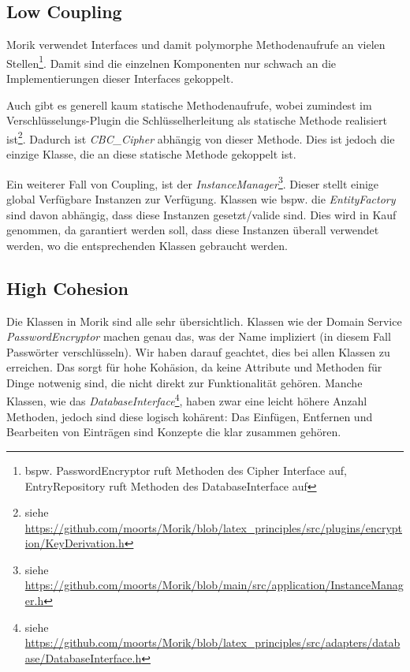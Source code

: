 \subsection{Low Coupling}

Morik verwendet Interfaces und damit polymorphe Methodenaufrufe an vielen Stellen\footnote{bspw. PasswordEncryptor ruft Methoden des Cipher Interface auf, EntryRepository ruft Methoden des DatabaseInterface auf}. Damit sind die einzelnen Komponenten nur schwach an die Implementierungen dieser Interfaces gekoppelt.

Auch gibt es generell kaum statische Methodenaufrufe, wobei zumindest im Verschlüsselungs-Plugin die Schlüsselherleitung als statische Methode realisiert ist\footnote{siehe \url{https://github.com/moorts/Morik/blob/latex_principles/src/plugins/encryption/KeyDerivation.h}}. Dadurch ist \textit{CBC\_Cipher} abhängig von dieser Methode. Dies ist jedoch die einzige Klasse, die an diese statische Methode gekoppelt ist.

Ein weiterer Fall von Coupling, ist der \textit{InstanceManager}\footnote{siehe \url{https://github.com/moorts/Morik/blob/main/src/application/InstanceManager.h}}. Dieser stellt einige global Verfügbare Instanzen zur Verfügung. Klassen wie bspw. die \textit{EntityFactory} sind davon abhängig, dass diese Instanzen gesetzt/valide sind. Dies wird in Kauf genommen, da garantiert werden soll, dass diese Instanzen überall verwendet werden, wo die entsprechenden Klassen gebraucht werden.

\subsection{High Cohesion}

Die Klassen in Morik sind alle sehr übersichtlich. Klassen wie der Domain Service \textit{PasswordEncryptor} machen genau das, was der Name impliziert (in diesem Fall Passwörter verschlüsseln). Wir haben darauf geachtet, dies bei allen Klassen zu erreichen. Das sorgt für hohe Kohäsion, da keine Attribute und Methoden für Dinge notwenig sind, die nicht direkt zur Funktionalität gehören. Manche Klassen, wie das \textit{DatabaseInterface}\footnote{siehe \url{https://github.com/moorts/Morik/blob/latex_principles/src/adapters/database/DatabaseInterface.h}}, haben zwar eine leicht höhere Anzahl Methoden, jedoch sind diese logisch kohärent: Das Einfügen, Entfernen und Bearbeiten von Einträgen sind Konzepte die klar zusammen gehören.
